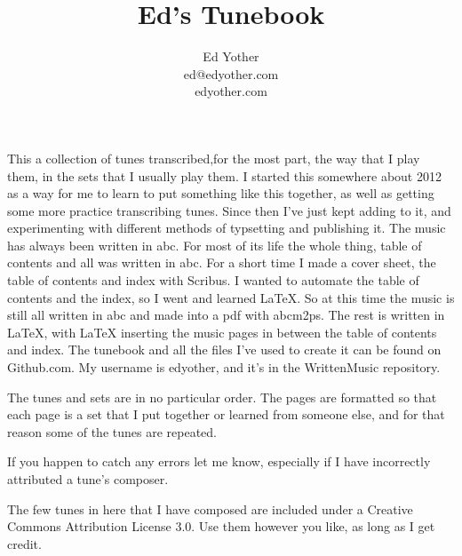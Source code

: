 \documentclass[11pt,letterpaper]{article}
\begin{document}

\title{Ed's Tunebook}
\author{Ed Yother\\ed@edyother.com\\edyother.com}
\maketitle

This a collection of tunes transcribed,for the most part, the way that I play them, in the sets that I usually play them. I started this somewhere about 2012 as a way for me to learn to put something like this together, as well as getting some more practice transcribing tunes. Since then I've just kept adding to it, and experimenting with different methods of typsetting and publishing it. The music has always been written in abc. For most of its life the whole thing, table of contents and all was written in abc. For a short time I made a cover sheet, the table of contents and index with Scribus. I wanted to automate the table of contents and the index, so I went and learned LaTeX. So at this time the music is still all written in abc and made into a pdf with abcm2ps. The rest is written in LaTeX, with LaTeX inserting the music pages in between the table of contents and index. The tunebook and all the files I've used to create it can be found on Github.com. My username is edyother, and it's in the WrittenMusic repository.

The tunes and sets are in no particular order. The pages are formatted so that each page is a set that I put together or learned from someone else, and for that reason some of the tunes are repeated.

If you happen to catch any errors let me know, especially if I have incorrectly attributed a tune's composer.

The few tunes in here that I have composed are included under a Creative Commons Attribution License 3.0. Use them however you like, as long as I get credit.

\pagebreak
\tableofcontents

\newpage
{}



\setcounter{page}{1}


\end{document}
